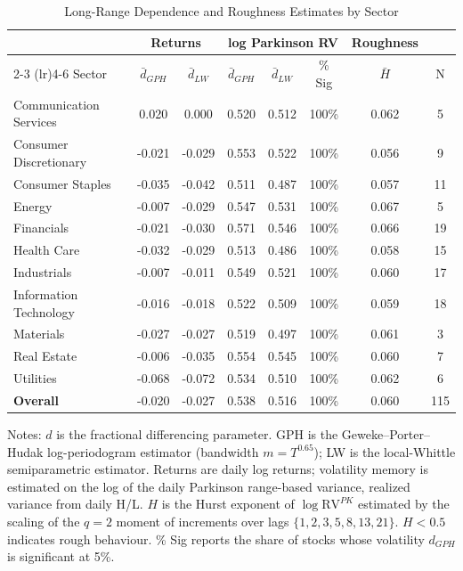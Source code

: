 
\begin{table}[htbp]
\centering
\caption{Long-Range Dependence and Roughness Estimates by Sector}
\label{tab:lrd_estimates}
\small
\begin{tabular}{lccccccc}
\toprule
 & \multicolumn{2}{c}{Returns} & \multicolumn{3}{c}{log Parkinson RV} & Roughness & \\
\cmidrule(lr){2-3} \cmidrule(lr){4-6}
Sector & $\bar d_{GPH}$ & $\bar d_{LW}$ & $\bar d_{GPH}$ & $\bar d_{LW}$ & \% Sig & $\bar H$ & N \\
\midrule
Communication Services & 0.020 & 0.000 & 0.520 & 0.512 & 100\% & 0.062 & 5 \\
Consumer Discretionary & -0.021 & -0.029 & 0.553 & 0.522 & 100\% & 0.056 & 9 \\
Consumer Staples & -0.035 & -0.042 & 0.511 & 0.487 & 100\% & 0.057 & 11 \\
Energy & -0.007 & -0.029 & 0.547 & 0.531 & 100\% & 0.067 & 5 \\
Financials & -0.021 & -0.030 & 0.571 & 0.546 & 100\% & 0.066 & 19 \\
Health Care & -0.032 & -0.029 & 0.513 & 0.486 & 100\% & 0.058 & 15 \\
Industrials & -0.007 & -0.011 & 0.549 & 0.521 & 100\% & 0.060 & 17 \\
Information Technology & -0.016 & -0.018 & 0.522 & 0.509 & 100\% & 0.059 & 18 \\
Materials & -0.027 & -0.027 & 0.519 & 0.497 & 100\% & 0.061 & 3 \\
Real Estate & -0.006 & -0.035 & 0.554 & 0.545 & 100\% & 0.060 & 7 \\
Utilities & -0.068 & -0.072 & 0.534 & 0.510 & 100\% & 0.062 & 6 \\
\midrule
\textbf{Overall} & -0.020 & -0.027 & 0.538 & 0.516 & 100\% & 0.060 & 115 \\
\bottomrule
\end{tabular}
\begin{tablenotes}\small
\item Notes: $d$ is the fractional differencing parameter. GPH is the Geweke--Porter--Hudak log-periodogram estimator (bandwidth $m = T^{0.65}$); LW is the local-Whittle semiparametric estimator. Returns are daily log returns; volatility memory is estimated on the log of the daily Parkinson range-based variance, realized variance from daily H/L. $H$ is the Hurst exponent of $\log\mathrm{RV}^{PK}$ estimated by the scaling of the $q=2$ moment of increments over lags $\{1,2,3,5,8,13,21\}$. $H<0.5$ indicates rough behaviour. \% Sig reports the share of stocks whose volatility $d_{GPH}$ is significant at 5\%.
\end{tablenotes}
\end{table}
